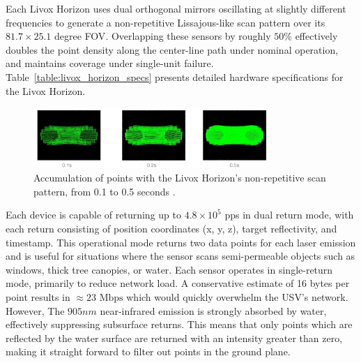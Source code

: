 \documentclass[../main.tex]{subfiles}
\begin{document}
Each Livox Horizon uses dual orthogonal mirrors oscillating at slightly different frequencies to generate a non-repetitive Lissajous-like scan pattern over its $81.7 \times 25.1$ degree \ac{FOV}. 
Overlapping these sensors by roughly $50 \%$ effectively doubles the point density along the center-line path under nominal operation, and maintains coverage under single-unit failure.
Table~\ref{table:livox_horizon_specs} presents detailed hardware specifications for the Livox Horizon.


\begin{figure}[htbp]
\centering
\includegraphics[width=0.8\textwidth]{Images/Livox_1.png}
\caption{Accumulation of points with the Livox Horizon's non-repetitive scan pattern, from 0.1 to 0.5 seconds  \cite{livox_manual}.}
\label{fig:livox_scan_pattern}
\end{figure}

Each device is capable of returning up to $4.8 \times 10^5$ \ac{pps} in dual return mode, with each return consisting of position coordinates (x, y, z), target reflectivity, and timestamp.
This operational mode returns two data points for each laser emission and is useful for situations where the sensor scans semi-permeable objects such as windows, thick tree canopies, or water.
Each sensor operates in single-return mode, primarily to reduce network load.
A conservative estimate of 16 bytes per point results in $\approx 23 \text{ Mbps}$ which would quickly overwhelm the \ac{USV}'s network.
However, The $905 nm$ near-infrared emission is strongly absorbed by water, effectively suppressing subsurface returns.
This means that only points which are reflected by the water surface are returned with an intensity greater than zero, making it straight forward to filter out points in the ground plane.
\end{document}
